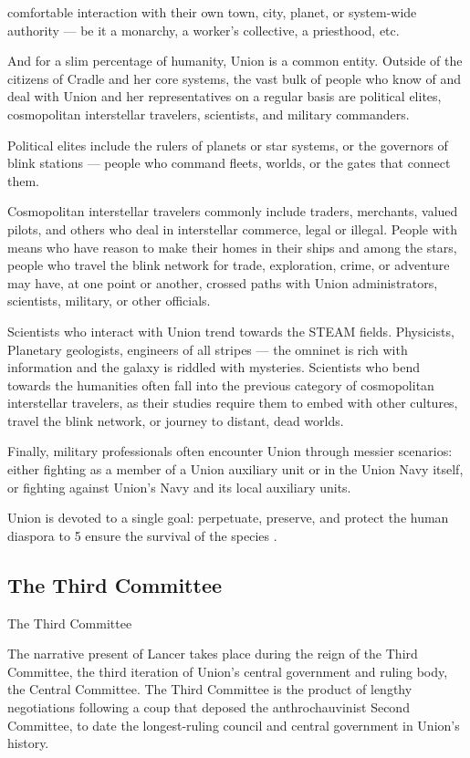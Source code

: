 comfortable interaction with their own town, city, planet, or system-wide authority — be it a
monarchy, a worker’s collective, a priesthood, etc.


And for a slim percentage of humanity, Union is a common entity. Outside of the citizens of
Cradle and her core systems, the vast bulk of people who know of and deal with Union and her
representatives on a regular basis are political elites, cosmopolitan interstellar travelers,
scientists, and military commanders.


Political elites include the rulers of planets or star systems, or the governors of blink stations —
people who command fleets, worlds, or the gates that connect them.


Cosmopolitan interstellar travelers commonly include traders, merchants, valued pilots, and
others who deal in interstellar commerce, legal or illegal. People with means who have reason to
make their homes in their ships and among the stars, people who travel the blink network for
trade, exploration, crime, or adventure may have, at one point or another, crossed paths with
Union administrators, scientists, military, or other officials.


Scientists who interact with Union trend towards the STEAM fields. Physicists, Planetary
geologists, engineers of all stripes — the omninet is rich with information and the galaxy is
riddled with mysteries. Scientists who bend towards the humanities often fall into the previous
category of cosmopolitan interstellar travelers, as their studies require them to embed with other
cultures, travel the blink network, or journey to distant, dead worlds.


Finally, military professionals often encounter Union through messier scenarios: either fighting as
a member of a Union auxiliary unit or in the Union Navy itself, or fighting against Union’s Navy
and its local auxiliary units.


Union is devoted to a single goal: perpetuate, preserve, and protect the human diaspora to
                                        5
ensure the survival of the species  .

\subsection{The Third Committee}
The Third Committee

The narrative present of Lancer takes place during the reign of the Third Committee, the third
iteration of Union’s central government and ruling body, the Central Committee. The Third
Committee is the product of lengthy negotiations following a coup that deposed the
anthrochauvinist Second Committee, to date the longest-ruling council and central government in
Union’s history.


